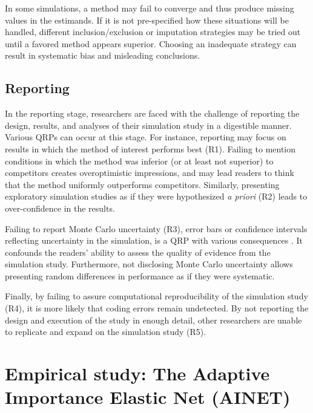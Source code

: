 \documentclass[a4paper, 11pt]{article}
\begin{document}
In some simulations, a method may fail to converge and thus produce missing values
in the estimands. If it is not pre-specified how these situations will be
handled, different inclusion/exclusion or imputation strategies may be tried out
until a favored method appears superior. Choosing an inadequate strategy can result 
in systematic bias and misleading conclusions.

\subsection{Reporting}
In the reporting stage, researchers are faced with the challenge of reporting
the design, results, and analyses of their simulation study in a digestible
manner. Various QRPs can occur at this stage. For instance, reporting may focus on results in which the method of interest performs best (R1).
Failing to mention conditions in which
the method was inferior (or at least not superior) to competitors creates
overoptimistic impressions, and may lead readers to think that the method
uniformly outperforms competitors. 
Similarly, presenting exploratory simulation studies as if they were hypothesized
\emph{a priori} (R2) leads to over-confidence in the results.

Failing to report Monte Carlo uncertainty (R3), \eg error bars or confidence
intervals reflecting uncertainty in the simulation, is a QRP with various
consequences \citep{van2019communicating}. It confounds the readers' ability to 
assess the quality of evidence from the simulation study. Furthermore, not
disclosing Monte Carlo uncertainty allows presenting random differences in
performance as if they were systematic.

Finally, by failing to assure computational reproducibility of the simulation study (R4),
it is more likely that coding errors remain undetected. By not
reporting the design and execution of the study in enough detail, other
researchers are unable to replicate and expand on the simulation study (R5).

\section{Empirical study: The Adaptive Importance Elastic Net
  (AINET)} \label{sec:study}
\end{document}
